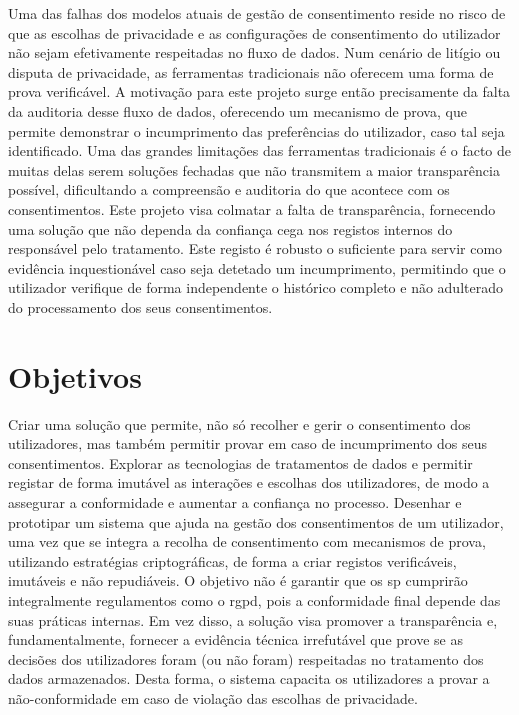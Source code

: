 Uma das falhas dos modelos atuais de gestão de consentimento reside no risco de que as escolhas de privacidade e as configurações de consentimento do utilizador não sejam efetivamente respeitadas no fluxo de dados. Num cenário de litígio ou disputa de privacidade, as ferramentas tradicionais não oferecem uma forma de prova verificável.
A motivação para este projeto surge então precisamente da falta da auditoria desse fluxo de dados, oferecendo um mecanismo de prova, que permite demonstrar o incumprimento das preferências do utilizador, caso tal seja identificado.
Uma das grandes limitações das ferramentas tradicionais é o facto de muitas delas serem soluções fechadas que não transmitem a maior transparência possível, dificultando a compreensão e auditoria do que acontece com os consentimentos.
Este projeto visa colmatar a falta de transparência, fornecendo uma solução que não dependa da confiança cega nos registos internos do responsável pelo tratamento. Este registo é robusto o suficiente para servir como evidência inquestionável caso seja detetado um incumprimento, permitindo que o utilizador verifique de forma independente o histórico completo e não adulterado do processamento dos seus consentimentos.

\section{Objetivos}

Criar uma solução que permite, não só recolher e gerir o consentimento dos utilizadores, mas também permitir provar em caso de incumprimento dos seus consentimentos.
Explorar as tecnologias de tratamentos de dados e permitir registar de forma imutável as interações e escolhas dos utilizadores, de modo a assegurar a conformidade e aumentar a confiança no processo. 
Desenhar e prototipar um sistema que ajuda na gestão dos consentimentos de um utilizador, uma vez que se integra a recolha de consentimento com mecanismos de prova, utilizando estratégias criptográficas, de forma a criar registos verificáveis, imutáveis e não repudiáveis.
O objetivo não é garantir que os \acrfull{sp} cumprirão integralmente regulamentos como o \acrshort{rgpd}, pois a conformidade final depende das suas práticas internas. Em vez disso, a solução visa promover a transparência e, fundamentalmente, fornecer a evidência técnica irrefutável que prove se as decisões dos utilizadores foram (ou não foram) respeitadas no tratamento dos dados armazenados.
Desta forma, o sistema capacita os utilizadores a provar a não-conformidade em caso de violação das escolhas de privacidade.

